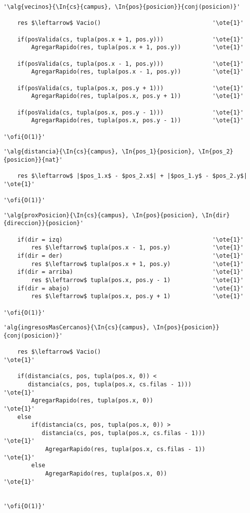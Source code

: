 \begin{lstlisting}[mathescape]
'\alg{vecinos}{\In{cs}{campus}, \In{pos}{posicion}}{conj(posicion)}'

	res $\leftarrow$ Vacio() 								'\ote{1}'

	if(posValida(cs, tupla(pos.x + 1, pos.y))) 				'\ote{1}'
		AgregarRapido(res, tupla(pos.x + 1, pos.y))			'\ote{1}'	

	if(posValida(cs, tupla(pos.x - 1, pos.y))) 				'\ote{1}'
		AgregarRapido(res, tupla(pos.x - 1, pos.y))			'\ote{1}'	

	if(posValida(cs, tupla(pos.x, pos.y + 1))) 				'\ote{1}'
		AgregarRapido(res, tupla(pos.x, pos.y + 1))			'\ote{1}'

	if(posValida(cs, tupla(pos.x, pos.y - 1)))				'\ote{1}'
		AgregarRapido(res, tupla(pos.x, pos.y - 1))			'\ote{1}'

'\ofi{O(1)}'
\end{lstlisting}

\begin{lstlisting}[mathescape]
'\alg{distancia}{\In{cs}{campus}, \In{pos_1}{posicion}, \In{pos_2}{posicion}}{nat}'
	
	res $\leftarrow$ |$pos_1.x$ - $pos_2.x$| + |$pos_1.y$ - $pos_2.y$|	'\ote{1}'

'\ofi{O(1)}'
\end{lstlisting}

\begin{lstlisting}[mathescape]
'\alg{proxPosicion}{\In{cs}{campus}, \In{pos}{posicion}, \In{dir}{direccion}}{posicion}'

	if(dir = izq)											'\ote{1}'
		res $\leftarrow$ tupla(pos.x - 1, pos.y)			'\ote{1}'
	if(dir = der)											'\ote{1}'
		res $\leftarrow$ tupla(pos.x + 1, pos.y)			'\ote{1}'
	if(dir = arriba)										'\ote{1}'
		res $\leftarrow$ tupla(pos.x, pos.y - 1)			'\ote{1}'
	if(dir = abajo)											'\ote{1}'
		res $\leftarrow$ tupla(pos.x, pos.y + 1)			'\ote{1}'

'\ofi{O(1)}'
\end{lstlisting}

\begin{lstlisting}[mathescape]
'alg{ingresosMasCercanos}{\In{cs}{campus}, \In{pos}{posicion}}{conj(posicion)}'

	res $\leftarrow$ Vacio()										'\ote{1}'

	if(distancia(cs, pos, tupla(pos.x, 0)) < 
	   distancia(cs, pos, tupla(pos.x, cs.filas - 1))) 				'\ote{1}'
		AgregarRapido(res, tupla(pos.x, 0))							'\ote{1}'
	else
		if(distancia(cs, pos, tupla(pos.x, 0)) > 
		   distancia(cs, pos, tupla(pos.x, cs.filas - 1))) 			'\ote{1}'
			AgregarRapido(res, tupla(pos.x, cs.filas - 1))			'\ote{1}'
		else
			AgregarRapido(res, tupla(pos.x, 0))						'\ote{1}'


'\ofi{O(1)}'
\end{lstlisting}